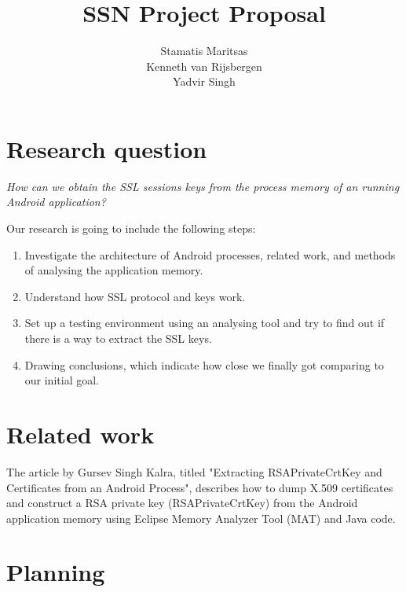 \documentclass[11pt]{article}
\title{\textbf{SSN Project Proposal}}
\author{Stamatis Maritsas\\
		Kenneth van Rijsbergen\\
		Yadvir Singh}
\date{}
\begin{document}
\maketitle




\section{Research question}

\begin{framed}
\noindent \textit{How can we obtain the SSL sessions keys from the process memory of an running Android application?}
\end{framed}
Our research is going to include the following steps:

\begin{enumerate}
\item{Investigate the architecture of Android processes, related work, and methods of analysing the application memory.}
\item{Understand how SSL protocol and keys work.}
\item{Set up a testing environment using an analysing tool and try to find out if there is a way to extract the SSL keys.}
\item{Drawing conclusions, which indicate how close we finally got comparing to our initial goal.}
\end{enumerate}

\clearpage

\section{Related work}
The article by Gursev Singh Kalra, titled "Extracting RSAPrivateCrtKey and Certificates from an Android Process", describes how to dump X.509 certificates and construct a RSA private key (RSAPrivateCrtKey) from the Android application memory using Eclipse Memory Analyzer Tool (MAT) and Java code.\cite{cite1}

\section{Planning}
\end{document}
